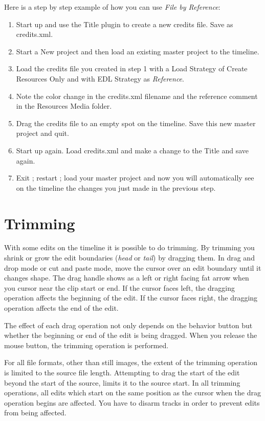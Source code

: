 Here is a step by step example of how you can use \textit{File by
	Reference}:
\begin{enumerate}
	\item Start up \CGG{} and use the Title plugin to create a new
	credits file.  Save as credits.xml.
	\item Start a New project and then load an existing master
	project to the timeline.
	\item Load the credits file you created in step 1 with a Load
	Strategy of Create Resources Only and with EDL Strategy as
	\textit{Reference}.
	\item Note the color change in the credits.xml filename and the
	reference comment in the Resources Media folder.
	\item Drag the credits file to an empty spot on the timeline.
	Save this new master project and quit.
	\item Start \CGG{} up again.  Load credits.xml and make a change
	to the Title and save again.
	\item Exit \CGG{}; restart \CGG{}; load your master project and
	now you will automatically see on the timeline the changes you just
	made in the previous step.
\end{enumerate}

\section{Trimming}%
\label{sec:trimming}

With some edits on the timeline it is possible to do trimming. By
trimming you shrink or grow the edit boundaries (\textit{head} or \textit{tail}) by dragging them. In
drag and drop mode or cut and paste mode, move the cursor over an
edit boundary until it changes shape. The drag handle  shows as a
left or right facing fat arrow when you cursor near the clip start
or end.  If the cursor faces left, the dragging operation affects
the beginning of the edit. If the cursor faces right, the dragging
operation affects the end of the edit.

The effect of each drag operation not only depends on the behavior
button but whether the beginning or end of the edit is being
dragged. When you release the mouse button, the trimming operation
is performed.

For all file formats, other than still images, the extent of the
trimming operation is limited to the source file length. Attempting
to drag the start of the edit beyond the start of the source, limits
it to the source start. In all trimming operations, all edits which
start on the same position as the cursor when the drag operation
begins are affected. You have to disarm tracks in order to prevent
edits from being affected.

